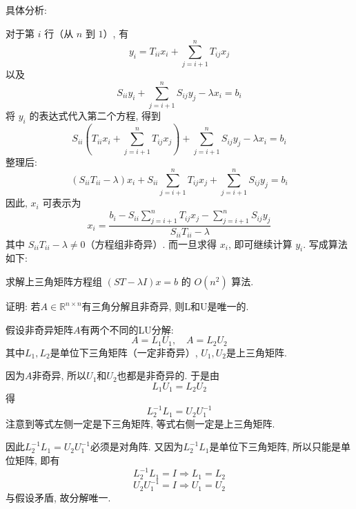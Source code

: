 \documentclass[12pt, answers]{exam}     %
\newcommand{\R}{\mathbb{R}}
\begin{document}
\begin{questions}
\begin{solution}
具体分析:

对于第 \(i\) 行（从 \(n\) 到 \(1\)）, 有
\[
y_i = T_{ii} x_i + \sum_{j=i+1}^{n} T_{ij} x_j
\]
以及
\[
S_{ii} y_i + \sum_{j=i+1}^{n} S_{ij} y_j - \lambda x_i = b_i
\]
将 \(y_i\) 的表达式代入第二个方程, 得到
\[
S_{ii} \left( T_{ii} x_i + \sum_{j=i+1}^{n} T_{ij} x_j \right) + \sum_{j=i+1}^{n} S_{ij} y_j - \lambda x_i = b_i
\]
整理后: 
\[
(S_{ii} T_{ii} - \lambda) x_i + S_{ii} \sum_{j=i+1}^{n} T_{ij} x_j + \sum_{j=i+1}^{n} S_{ij} y_j = b_i
\]
因此, \(x_i\) 可表示为
\[
x_i = \frac{ b_i - S_{ii} \sum_{j=i+1}^{n} T_{ij} x_j - \sum_{j=i+1}^{n} S_{ij} y_j }{ S_{ii} T_{ii} - \lambda }
\]
其中 \(S_{ii} T_{ii} - \lambda \neq 0 \)（方程组非奇异）. 而一旦求得 \(x_i\), 即可继续计算 \(y_i\). 写成算法如下:

\begin{algorithm}[H]
\caption{求解上三角矩阵方程组 \((ST - \lambda I)x = b\) 的 \(O(n^2)\) 算法.}
\end{algorithm}
\end{solution}

\question{}证明: 若$ A \in \R^{n \times n} $有三角分解且非奇异, 则L和U是唯一的.

\begin{solution}假设非奇异矩阵$A$有两个不同的LU分解: 
\[
A = L_1U_1, \quad A = L_2U_2
\]
其中$L_1,L_2$是单位下三角矩阵（一定非奇异）, $U_1,U_2$是上三角矩阵. 

因为$A$非奇异, 所以$U_1$和$U_2$也都是非奇异的. 于是由 
\[ L_1U_1 = L_2U_2 \]
得
\[ L_2^{-1}L_1 = U_2U_1^{-1} \]
注意到等式左侧一定是下三角矩阵, 等式右侧一定是上三角矩阵. 

因此$L_2^{-1}L_1 = U_2U_1^{-1}$必须是对角阵. 又因为$L_2^{-1}L_1$是单位下三角矩阵, 所以只能是单位矩阵, 即有
\[ L_2^{-1}L_1 = I \Rightarrow L_1 = L_2 \]
\[ U_2U_1^{-1} = I \Rightarrow U_1 = U_2 \]
与假设矛盾, 故分解唯一.
\end{solution}



\end{questions}
\end{document}
